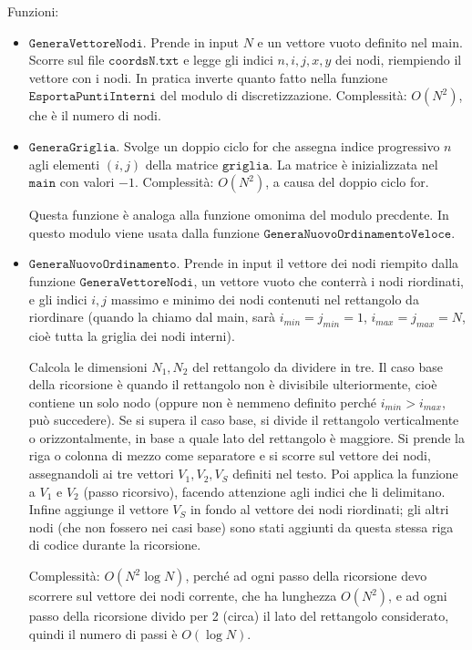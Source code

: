 \documentclass{article}
\begin{document}
Funzioni:
\begin{itemize}
\item $\texttt{GeneraVettoreNodi}$. Prende in input $N$ e un vettore vuoto definito nel main.
Scorre sul file $\texttt{coordsN.txt}$ e legge gli indici $n,i,j,x,y$ dei nodi, riempiendo il vettore con i nodi.
In pratica inverte quanto fatto nella funzione $\texttt{EsportaPuntiInterni}$ del modulo di discretizzazione.
Complessità: $O(N^2)$, che è il numero di nodi.

\item $\texttt{GeneraGriglia}$.
Svolge un doppio ciclo for che assegna indice progressivo $n$ agli elementi $(i,j)$ della matrice $\texttt{griglia}$.
La matrice è inizializzata nel $\texttt{main}$ con valori $-1$.
Complessità: $O(N^2)$, a causa del doppio ciclo for.

Questa funzione è analoga alla funzione omonima del modulo precdente. In questo modulo viene usata dalla funzione $\texttt{GeneraNuovoOrdinamentoVeloce}$.

\item $\texttt{GeneraNuovoOrdinamento}$.
Prende in input il vettore dei nodi riempito dalla funzione $\texttt{GeneraVettoreNodi}$, un vettore vuoto che conterrà i nodi riordinati, e gli indici $i,j$ massimo e minimo dei nodi contenuti nel rettangolo da riordinare (quando la chiamo dal main, sarà $i_{min} = j_{min} = 1$, $i_{max} = j_{max} = N$, cioè tutta la griglia dei nodi interni).

Calcola le dimensioni $N_1, N_2$ del rettangolo da dividere in tre.
Il caso base della ricorsione è quando il rettangolo non è divisibile ulteriormente, cioè contiene un solo nodo (oppure non è nemmeno definito perché $i_{min} >i_{max}$, può succedere).
Se si supera il caso base, si divide il rettangolo verticalmente o orizzontalmente, in base a quale lato del rettangolo è maggiore.
Si prende la riga o colonna di mezzo come separatore e si scorre sul vettore dei nodi, assegnandoli ai tre vettori $V_1, V_2, V_S$ definiti nel testo.
Poi applica la funzione a $V_1$ e $V_2$ (passo ricorsivo), facendo attenzione agli indici che li delimitano.
Infine aggiunge il vettore $V_S$ in fondo al vettore dei nodi riordinati; gli altri nodi (che non fossero nei casi base) sono stati aggiunti da questa stessa riga di codice durante la ricorsione.

Complessità: $O(N^2 \log N )$, perché ad ogni passo della ricorsione devo scorrere sul vettore dei nodi corrente, che ha lunghezza $O(N^2)$, e ad ogni passo della ricorsione divido per 2 (circa) il lato del rettangolo considerato, quindi il numero di passi è $O(\log N)$.


\end{itemize}
\end{document}
